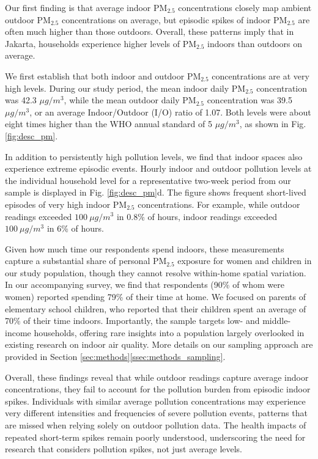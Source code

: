 \documentclass[9pt,twocolumn,twoside]{pnas-new}
\begin{document}
Our first finding is that average indoor PM$_{2.5}$ concentrations closely map ambient outdoor PM$_{2.5}$ concentrations on average, but episodic spikes of indoor PM$_{2.5}$ are often much higher than those outdoors. Overall, these patterns imply that in Jakarta, households experience higher levels of PM$_{2.5}$ indoors than outdoors on average.

We first establish that both indoor and outdoor PM$_{2.5}$ concentrations are at very high levels. During our study period, the mean indoor daily PM$_{2.5}$ concentration was 42.3 $\mu g/m^3$, while the mean outdoor daily PM$_{2.5}$ concentration was 39.5 $\mu g/m^3$, or an average Indoor/Outdoor (I/O) ratio of 1.07. Both levels were about eight times higher than the WHO annual standard of 5 $\mu g/m^3$, as shown in Fig. \ref{fig:desc_pm}.

In addition to persistently high pollution levels, we find that indoor spaces also experience extreme episodic events. Hourly indoor and outdoor pollution levels at the individual household level for a representative two-week period from our sample is displayed in Fig. \ref{fig:desc_pm}d. 
The figure shows frequent short-lived episodes of very high indoor PM$_{2.5}$ concentrations. For example, while outdoor readings exceeded $100~\mu g/m^3$ in 0.8\% of hours, indoor readings exceeded $100~\mu g/m^3$ in 6\% of hours. 

Given how much time our respondents spend indoors, these measurements capture a substantial share of personal PM$_{2.5}$ exposure for women and children in our study population, though they cannot resolve within-home spatial variation. In our accompanying survey, we find that respondents (90\% of whom were women) reported spending 79\% of their time at home. We focused on parents of elementary school children, who reported that their children spent an average of 70\% of their time indoors. Importantly, the sample targets low- and middle-income households, offering rare insights into a population largely overlooked in existing research on indoor air quality. More details on our sampling approach are provided in Section \ref{sec:methods}\ref{ssec:methods_sampling}.

Overall, these findings reveal that while outdoor readings capture average indoor concentrations, they fail to account for the pollution burden from episodic indoor spikes. Individuals with similar average pollution concentrations may experience very different intensities and frequencies of severe pollution events, patterns that are missed when relying solely on outdoor pollution data. The health impacts of repeated short-term spikes remain poorly understood, underscoring the need for research that considers pollution spikes, not just average levels.
\end{document}
